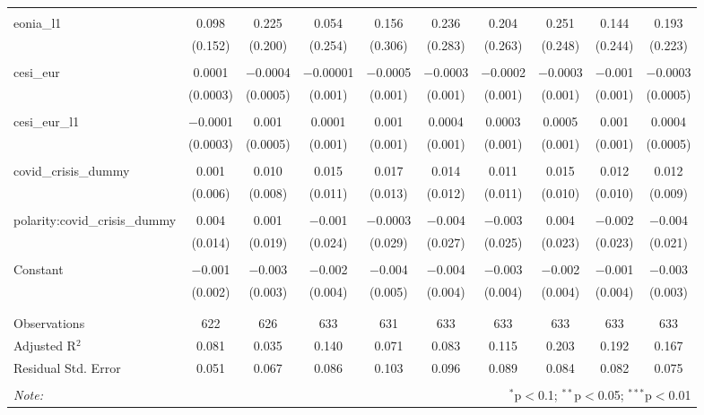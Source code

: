 \begin{table}[!htbp]
\begin{adjustbox}{width=1.25\textwidth}
\begin{tabular}{@{\extracolsep{5pt}}lccccccccc}
  & & & & & & & & & \\ 
 eonia\_l1 & 0.098 & 0.225 & 0.054 & 0.156 & 0.236 & 0.204 & 0.251 & 0.144 & 0.193 \\ 
  & (0.152) & (0.200) & (0.254) & (0.306) & (0.283) & (0.263) & (0.248) & (0.244) & (0.223) \\ 
  & & & & & & & & & \\ 
 cesi\_eur & 0.0001 & $-$0.0004 & $-$0.00001 & $-$0.0005 & $-$0.0003 & $-$0.0002 & $-$0.0003 & $-$0.001 & $-$0.0003 \\ 
  & (0.0003) & (0.0005) & (0.001) & (0.001) & (0.001) & (0.001) & (0.001) & (0.001) & (0.0005) \\ 
  & & & & & & & & & \\ 
 cesi\_eur\_l1 & $-$0.0001 & 0.001 & 0.0001 & 0.001 & 0.0004 & 0.0003 & 0.0005 & 0.001 & 0.0004 \\ 
  & (0.0003) & (0.0005) & (0.001) & (0.001) & (0.001) & (0.001) & (0.001) & (0.001) & (0.0005) \\ 
  & & & & & & & & & \\ 
 covid\_crisis\_dummy & 0.001 & 0.010 & 0.015 & 0.017 & 0.014 & 0.011 & 0.015 & 0.012 & 0.012 \\ 
  & (0.006) & (0.008) & (0.011) & (0.013) & (0.012) & (0.011) & (0.010) & (0.010) & (0.009) \\ 
  & & & & & & & & & \\ 
 polarity:covid\_crisis\_dummy & 0.004 & 0.001 & $-$0.001 & $-$0.0003 & $-$0.004 & $-$0.003 & 0.004 & $-$0.002 & $-$0.004 \\ 
  & (0.014) & (0.019) & (0.024) & (0.029) & (0.027) & (0.025) & (0.023) & (0.023) & (0.021) \\ 
  & & & & & & & & & \\ 
 Constant & $-$0.001 & $-$0.003 & $-$0.002 & $-$0.004 & $-$0.004 & $-$0.003 & $-$0.002 & $-$0.001 & $-$0.003 \\ 
  & (0.002) & (0.003) & (0.004) & (0.005) & (0.004) & (0.004) & (0.004) & (0.004) & (0.003) \\ 
  & & & & & & & & & \\ 
\hline \\[-1.8ex] 
Observations & 622 & 626 & 633 & 631 & 633 & 633 & 633 & 633 & 633 \\ 
Adjusted R$^{2}$ & 0.081 & 0.035 & 0.140 & 0.071 & 0.083 & 0.115 & 0.203 & 0.192 & 0.167 \\ 
Residual Std. Error & 0.051 & 0.067 & 0.086 & 0.103 & 0.096 & 0.089 & 0.084 & 0.082 & 0.075 \\ 
\hline 
\hline \\[-1.8ex] 
\textit{Note:}  & \multicolumn{9}{r}{$^{*}$p$<$0.1; $^{**}$p$<$0.05; $^{***}$p$<$0.01} \\ 
\end{tabular} 
\end{adjustbox} 
\end{table} 

